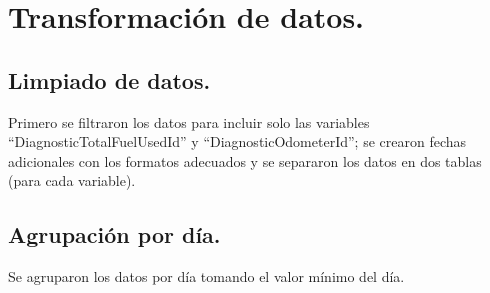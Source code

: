 \documentclass[]{article}
\newenvironment{Shaded}{\begin{snugshade}}{\end{snugshade}}
\newcommand{\KeywordTok}[1]{\textcolor[rgb]{0.13,0.29,0.53}{\textbf{#1}}}
\newcommand{\StringTok}[1]{\textcolor[rgb]{0.31,0.60,0.02}{#1}}
\newcommand{\OperatorTok}[1]{\textcolor[rgb]{0.81,0.36,0.00}{\textbf{#1}}}
\newcommand{\NormalTok}[1]{#1}
\begin{document}
\section{Transformación de datos.}\label{transformacion-de-datos.}

\subsection{Limpiado de datos.}\label{limpiado-de-datos.}

Primero se filtraron los datos para incluir solo las variables
``DiagnosticTotalFuelUsedId'' y ``DiagnosticOdometerId''; se crearon
fechas adicionales con los formatos adecuados y se separaron los datos
en dos tablas (para cada variable).

\begin{Shaded}
\end{Shaded}

\subsection{Agrupación por día.}\label{agrupacion-por-dia.}

Se agruparon los datos por día tomando el valor mínimo del día.
\end{document}
